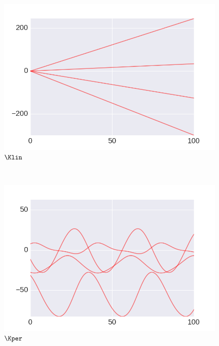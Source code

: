      \begin{subfigure}[b]{0.3\textwidth}
        \includegraphics[width=\textwidth]{figs/composition/composition_demo_LIN_prior.png}
        \caption{$\Klin$}
    \end{subfigure}
    ~ %
    \begin{subfigure}[b]{0.3\textwidth}
        \includegraphics[width=\textwidth]{figs/composition/composition_demo_PER_prior.png}
        \caption{$\Kper$}
    \end{subfigure}
    ~ %
